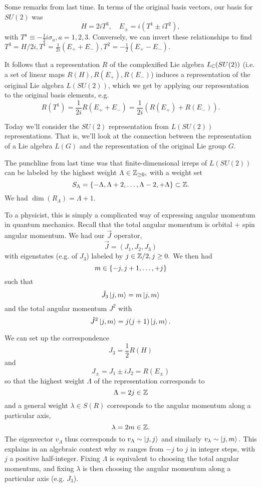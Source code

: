 Some remarks from last time. In terms of the original basis vectors, our basis for $SU(2)$ was
$$H=2i T^3,\quad E_\pm =i(T^1 \pm i T^2),$$
with $T^a\equiv-\frac{1}{2}i \sigma_a, a=1,2,3.$ Conversely, we can invert these relationships to find $T^3=H/2i, T^1=\frac{1}{2i}(E_+ + E_-), T^2= -\frac{1}{2}(E_+-E_-).$

It follows that a representation $R$ of the complexified Lie algebra $L_{\mathbb{C}}(SU(2))$ (i.e. a set of linear maps $R(H),R(E_+),R(E_-)$) induces a representation of the original Lie algebra $L(SU(2))$, which we get by applying our representation to the original basis elements, e.g.
$$R(T^1)=\frac{1}{2i} R(E_+ + E_-)=\frac{1}{2i}(R(E_+)+R(E_-)).$$

Today we'll consider the $SU(2)$ representation from $L(SU(2))$ representations. That is, we'll look at the connection between the representation of a Lie algebra $L(G)$ and the representation of the original Lie group $G$.

The punchline from last time was that finite-dimensional irreps of $L(SU(2))$ can be labeled by the highest weight $\Lambda \in \mathbb{Z}_{\geq 0},$ with a weight set
$$S_\Lambda=\{-\Lambda, \Lambda+2,\ldots, \Lambda-2, +\Lambda\}\subset \mathbb{Z}.$$
We had $\dim(R_\Lambda)=\Lambda+1$.

To a physicist, this is simply a complicated way of expressing angular momentum in quantum mechanics. Recall that the total angular momentum is orbital $+$ spin angular momentum. We had our $\vec J$ operator,
$$\vec J=(J_1,J_2,J_3)$$ with eigenstates (e.g. of $J_3$) labeled by $j\in \mathbb{Z}/2, j\geq 0.$ We then had
$$m\in \{-j,j+1,\ldots,+j\}$$
such that
$$\hat J_3\left| j,m \right>=m\left| j,m \right>$$
and the total angular momentum $J^2$ with
$$\hat J^2 \left| j,m \right>=j(j+1)\left| j,m \right>.$$

We can set up the correspondence
$$J_3=\frac{1}{2}R(H)$$
and
$$J_\pm = J_1\pm i J_2 = R(E_\pm)$$
so that the highest weight $\Lambda$ of the representation corresponds to 
$$\Lambda = 2j \in \mathbb{Z}$$ and a general weight $\lambda \in S(R)$ corresponds to the angular momentum along a particular axis,
$$\lambda = 2m\in \mathbb{Z}.$$
The eigenvector $v_\Lambda$ thus corresponds to
$v_\Lambda \sim \left| j,j \right>$ and similarly $v_\lambda \sim \left| j,m \right>.$
This explains in an algebraic context why $m$ ranges from $-j$ to $j$ in integer steps, with $j$ a positive half-integer. Fixing $\Lambda$ is equivalent to choosing the total angular momentum, and fixing $\lambda$ is then choosing the angular momentum along a particular axis (e.g. $J_3$).

